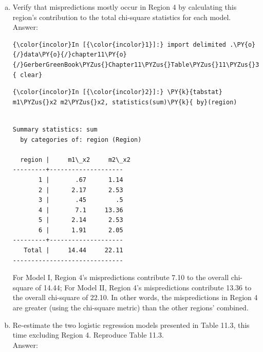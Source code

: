 \documentclass[11pt,notitlepage]{article}\usepackage[]{graphicx}\usepackage[]{color}
\makeatletter
\newenvironment{kframe}{%
 \def\at@end@of@kframe{}%
 \ifinner\ifhmode%
  \def\at@end@of@kframe{\end{minipage}}%
  \begin{minipage}{\columnwidth}%
 \fi\fi%
 \def\FrameCommand##1{\hskip\@totalleftmargin \hskip-\fboxsep
 \colorbox{shadecolor}{##1}\hskip-\fboxsep
     \hskip-\linewidth \hskip-\@totalleftmargin \hskip\columnwidth}%
 \MakeFramed {\advance\hsize-\width
   \@totalleftmargin\z@ \linewidth\hsize
   \@setminipage}}%
 {\par\unskip\endMakeFramed%
 \at@end@of@kframe}
\newenvironment{knitrout}{}{} %
\makeatother
\begin{document}
\begin{enumerate}[a)]
\item Verify that mispredictions mostly occur in Region 4 by calculating this region's contribution to the total chi-square statistics for each model.\\
Answer:\\
\begin{knitrout}
\color{fgcolor}\begin{kframe}
   \begin{Verbatim}[commandchars=\\\{\}]
{\color{incolor}In [{\color{incolor}1}]:} import delimited .\PY{o}{/}data\PY{o}{/}chapter11\PY{o}{/}GerberGreenBook\PYZus{}Chapter11\PYZus{}Table\PYZus{}11\PYZus{}3,\PY{k}{ clear}
\end{Verbatim}

    \begin{Verbatim}[commandchars=\\\{\}]
{\color{incolor}In [{\color{incolor}2}]:} \PY{k}{tabstat} m1\PYZus{}x2 m2\PYZus{}x2, statistics(sum)\PY{k}{ by}(region)
\end{Verbatim}

    \begin{Verbatim}[commandchars=\\\{\}]

Summary statistics: sum
  by categories of: region (Region)

  region |     m1\_x2     m2\_x2
---------+--------------------
       1 |       .67      1.14
       2 |      2.17      2.53
       3 |       .45        .5
       4 |       7.1     13.36
       5 |      2.14      2.53
       6 |      1.91      2.05
---------+--------------------
   Total |     14.44     22.11
------------------------------

    \end{Verbatim}
\end{kframe}
\end{knitrout}

For Model I, Region 4's mispredictions contribute 7.10 to the overall chi-square of 14.44; For Model II, Region 4's mispredictions contribute 13.36 to the overall chi-square of 22.10.  In other words, the mispredictions in Region 4 are greater (using the chi-square metric) than the other regions' combined.

\item Re-estimate the two logistic regression models presented in Table 11.3, this time excluding Region 4. Reproduce Table 11.3.\\
Answer:\\


\end{enumerate}
\end{document}
